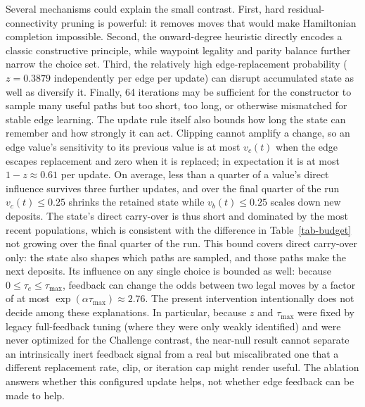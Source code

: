 \documentclass[pdflatex,sn-basic,iicol]{sn-jnl}
\begin{document}
Several mechanisms could explain the small contrast. First, hard residual-connectivity pruning is powerful: it removes moves that would make Hamiltonian completion impossible. Second, the onward-degree heuristic directly encodes a classic constructive principle, while waypoint legality and parity balance further narrow the choice set. Third, the relatively high edge-replacement probability ($z=0.3879$ independently per edge per update) can disrupt accumulated state as well as diversify it. Finally, 64 iterations may be sufficient for the constructor to sample many useful paths but too short, too long, or otherwise mismatched for stable edge learning. The update rule itself also bounds how long the state can remember and how strongly it can act. Clipping cannot amplify a change, so an edge value's sensitivity to its previous value is at most $v_c(t)$ when the edge escapes replacement and zero when it is replaced; in expectation it is at most $1-z\approx0.61$ per update. On average, less than a quarter of a value's direct influence survives three further updates, and over the final quarter of the run $v_c(t)\le0.25$ shrinks the retained state while $v_b(t)\le0.25$ scales down new deposits. The state's direct carry-over is thus short and dominated by the most recent populations, which is consistent with the difference in Table~\ref{tab-budget} not growing over the final quarter of the run. This bound covers direct carry-over only: the state also shapes which paths are sampled, and those paths make the next deposits. Its influence on any single choice is bounded as well: because $0\le\tau_e\le\tau_{\max}$, feedback can change the odds between two legal moves by a factor of at most $\exp(\alpha\tau_{\max})\approx2.76$. The present intervention intentionally does not decide among these explanations. In particular, because $z$ and $\tau_{\max}$ were fixed by legacy full-feedback tuning (where they were only weakly identified) and were never optimized for the Challenge contrast, the near-null result cannot separate an intrinsically inert feedback signal from a real but miscalibrated one that a different replacement rate, clip, or iteration cap might render useful. The ablation answers whether this configured update helps, not whether edge feedback can be made to help.
\end{document}
